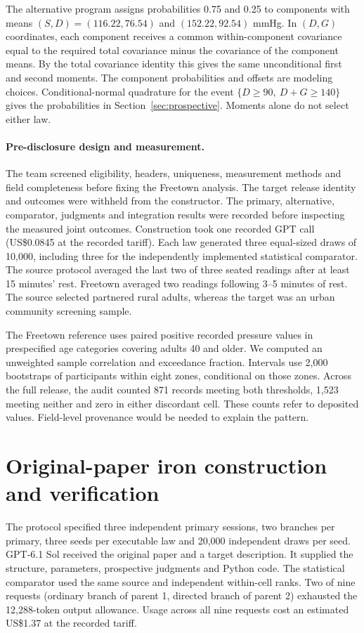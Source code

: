 The alternative program assigns probabilities 0.75 and 0.25 to components with means $(S,D)=(116.22,76.54)$ and $(152.22,92.54)$ mmHg. In $(D,G)$ coordinates, each component receives a common within-component covariance equal to the required total covariance minus the covariance of the component means. By the total covariance identity this gives the same unconditional first and second moments. The component probabilities and offsets are modeling choices. Conditional-normal quadrature for the event $\{D\geq90,\ D+G\geq140\}$ gives the probabilities in Section~\ref{sec:prospective}. Moments alone do not select either law.

\paragraph{Pre-disclosure design and measurement.}
The team screened eligibility, headers, uniqueness, measurement methods and field completeness before fixing the Freetown analysis. The target release identity and outcomes were withheld from the constructor. The primary, alternative, comparator, judgments and integration results were recorded before inspecting the measured joint outcomes. Construction took one recorded GPT call (US\$0.0845 at the recorded tariff). Each law generated three equal-sized draws of 10,000, including three for the independently implemented statistical comparator. The source protocol averaged the last two of three seated readings after at least 15 minutes' rest. Freetown averaged two readings following 3--5 minutes of rest. The source selected partnered rural adults, whereas the target was an urban community screening sample.

The Freetown reference uses paired positive recorded pressure values in prespecified age categories covering adults 40 and older. We computed an unweighted sample correlation and exceedance fraction. Intervals use 2,000 bootstraps of participants within eight zones, conditional on those zones. Across the full release, the audit counted 871 records meeting both thresholds, 1,523 meeting neither and zero in either discordant cell. These counts refer to deposited values. Field-level provenance would be needed to explain the pattern.



\section{Original-paper iron construction and verification}
\label{app:ironpros}
The protocol specified three independent primary sessions, two branches per primary, three seeds per executable law and 20,000 independent draws per seed. GPT-6.1 Sol received the original paper and a target description. It supplied the structure, parameters, prospective judgments and Python code. The statistical comparator used the same source and independent within-cell ranks. Two of nine requests (ordinary branch of parent 1, directed branch of parent 2) exhausted the 12,288-token output allowance. Usage across all nine requests cost an estimated US\$1.37 at the recorded tariff.

